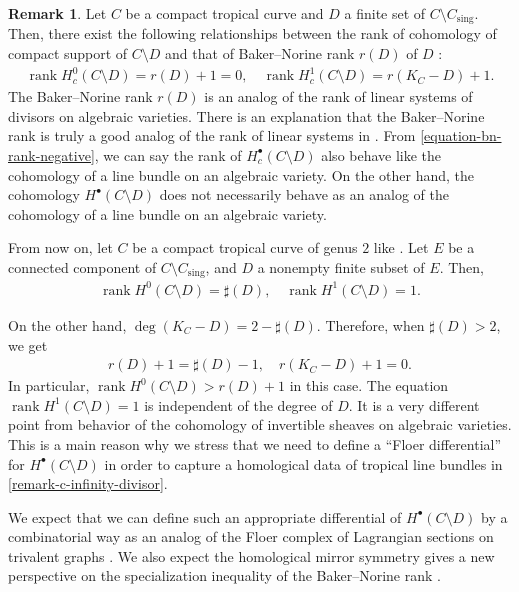 \documentclass[a4paper,dvipdfmx,reqno,12pt]{amsart}
\theoremstyle{definition}
\newtheorem{remark}[theorem]{Remark}
\newcommand{\opn}[1]{\operatorname{#1}}
\numberwithin{equation}{section}
\begin{document}
\begin{remark}
\label{remark-complement-cohomology}
Let $C$ be a compact tropical curve and $D$
a finite set of $C\setminus C_{\mathrm{sing}}$.
Then, there exist the following relationships
between the rank of cohomology of compact support
of $C\setminus D$ and that of Baker--Norine rank
$r(D)$ of $D$ \cite[Definition 1.12]{MR2377750}: 
\begin{align}
\label{equation-bn-rank-negative}
\opn{rank} H_c^{0}(C\setminus D)=r(D)+1=0, \quad
\opn{rank} H_c^{1}(C\setminus D)=r(K_C-D)+1.
\end{align}
The Baker--Norine rank $r(D)$ is an analog of 
the rank of linear systems of divisors on
algebraic varieties.
There is an explanation that the Baker--Norine
rank is truly a good analog of the rank of linear systems
in \cite{MR2448666}.
From \eqref{equation-bn-rank-negative},
we can say the rank of $H_c^{\bullet}(C\setminus D)$
also behave like the cohomology of a line bundle on
an algebraic variety.
On the other hand, the cohomology
$H^{\bullet}(C\setminus D)$ does not necessarily behave
as an analog of the cohomology of a line bundle on
an algebraic variety.

From now on, let $C$ be a compact tropical curve
of genus $2$ like \cite[Figure 1]{MR2457739}.
Let $E$ be a connected component of  
 $C\setminus C_{\mathrm{sing}}$, and
$D$ a nonempty finite subset of $E$. 
Then,
\begin{align}
\label{equation-cohomology-behaviour}
\opn{rank} H^{0}(C\setminus D)=\sharp(D), \quad
\opn{rank} H^{1}(C\setminus D)=1.
\end{align}

On the other hand, $\opn{deg}(K_C-D)=2-\sharp (D)$.
Therefore, when $\sharp (D)>2$, we get
\begin{align}
\label{equation-rank-behaviour}
r(D)+1=\sharp(D)-1,\quad r(K_C-D)+1=0.
\end{align}
In particular, 
$\opn{rank} H^{0}(C\setminus D)>r(D)+1$ in this case.
The equation $\opn{rank} H^{1}(C\setminus D)=1$ is
independent of the degree of $D$.
It is a very different point from behavior of 
the cohomology of invertible sheaves on algebraic varieties.
This is a main reason why we stress 
that we need to define a ``Floer differential'' for 
$H^{\bullet}(C\setminus D)$ in order to capture a
homological data of tropical line bundles 
in \cref{remark-c-infinity-divisor}.

We expect that we can define such an appropriate
differential of $H^{\bullet}(C\setminus D)$
by a combinatorial way as an analog of
the Floer complex of Lagrangian sections on 
trivalent graphs
\cite{auroux2022lagrangian}.
We also expect the homological mirror symmetry
gives a new perspective on the specialization
inequality of the Baker--Norine rank 
\cite[Lemma 2.8]{MR2448666}. 
\end{remark}
\end{document}
